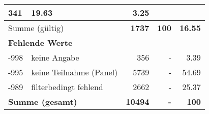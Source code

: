\begin{longtable}{lXrrr}
       \num{341} &
       \num[round-mode=places,round-precision=2]{19,63} &
         \num[round-mode=places,round-precision=2]{3,25} \\
     \midrule
     \multicolumn{2}{l}{Summe (gültig)} &
       \textbf{\num{1737}} &
     \textbf{100} &
       \textbf{\num[round-mode=places,round-precision=2]{16,55}} \\
     \multicolumn{5}{l}{\textbf{Fehlende Werte}}\\
       -998 &
       keine Angabe &
         \num{356} &
        - &
         \num[round-mode=places,round-precision=2]{3,39} \\
       -995 &
       keine Teilnahme (Panel) &
         \num{5739} &
        - &
         \num[round-mode=places,round-precision=2]{54,69} \\
       -989 &
       filterbedingt fehlend &
         \num{2662} &
        - &
         \num[round-mode=places,round-precision=2]{25,37} \\
     \midrule
     \multicolumn{2}{l}{\textbf{Summe (gesamt)}} &
          \textbf{\num{10494}} &
        \textbf{-} &
        \textbf{100} \\
     \bottomrule
     \end{longtable}
     

